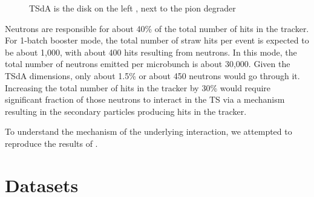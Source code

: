 \documentclass[12pt]{article}
\begin{document}
\begin{figure}[H]
  \caption{
    \label{figure:ds2_cutout}
    TSdA is the disk on the left , next to the pion degrader
  }
\end{figure}

Neutrons are responsible for about 40\% of the total number of hits in the tracker.
For 1-batch booster mode, the total number of straw hits per event is expected to be
about 1,000, with about 400 hits resulting from neutrons.
In this mode, the total number of neutrons emitted per microbunch is about 30,000.
Given the TSdA dimensions, only about 1.5\% or about 450 neutrons would go through it.
Increasing the total number of hits in the tracker by 30\% would require
significant fraction of those neutrons to interact in the TS via a mechanism resulting 
in the secondary particles producing hits in the tracker.

To understand the mechanism of the underlying interaction, we attempted
to reproduce the results of \cite{MU2E_3479_NEUTRON_SHIELDING}.


\section {Datasets}
\end{document}

